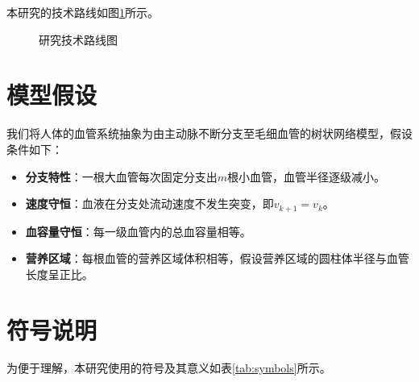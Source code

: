 \par
本研究的技术路线如图\ref{fig:techpath}所示。

\begin{figure}[H]
\centering

\caption{研究技术路线图}
\label{fig:techpath}
\end{figure}

\section{模型假设}

我们将人体的血管系统抽象为由主动脉不断分支至毛细血管的树状网络模型，假设条件如下：

\begin{itemize}
    \item \textbf{分支特性}：一根大血管每次固定分支出$m$根小血管，血管半径逐级减小。
    \item \textbf{速度守恒}：血液在分支处流动速度不发生突变，即$v_{k+1} = v_k$。
    \item \textbf{血容量守恒}：每一级血管内的总血容量相等。
    \item \textbf{营养区域}：每根血管的营养区域体积相等，假设营养区域的圆柱体半径与血管长度呈正比。
\end{itemize}

\section{符号说明}

为便于理解，本研究使用的符号及其意义如表\ref{tab:symbols}所示。

